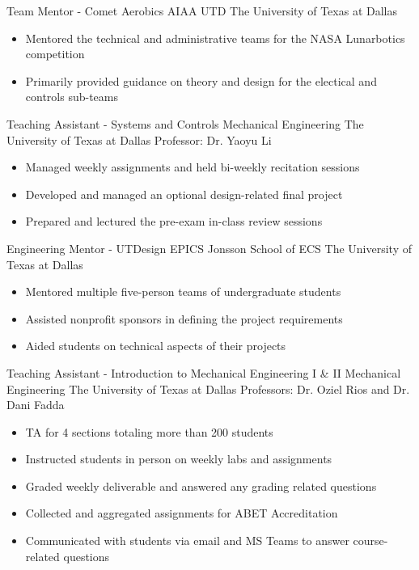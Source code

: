 \documentclass[11pt,letterpaper,roman]{moderncv} %
\begin{document}
{Team Mentor - Comet Aerobics}
{AIAA UTD}
{The University of Texas at Dallas}{}
{\begin{itemize}
    \item Mentored the technical and administrative teams for the NASA Lunarbotics competition
    \item Primarily provided guidance on theory and design for the electical and controls sub-teams
\end{itemize}}

{Teaching Assistant - Systems and Controls}
{Mechanical Engineering}
{The University of Texas at Dallas}
{Professor: Dr. Yaoyu Li}
{\begin{itemize}
    \item Managed weekly assignments and held bi-weekly recitation sessions
    \item Developed and managed an optional design-related final project
    \item Prepared and lectured the pre-exam in-class review sessions
\end{itemize}}

{Engineering Mentor - UTDesign EPICS}
{Jonsson School of ECS}%
{The University of Texas at Dallas}{}
{\begin{itemize}
    \item Mentored multiple five-person teams of undergraduate students 
    \item Assisted nonprofit sponsors in defining the project requirements
    \item Aided students on technical aspects of their projects
\end{itemize}}

{Teaching Assistant - Introduction to Mechanical Engineering I \& II}
{Mechanical Engineering}
{The University of Texas at Dallas}
{Professors: Dr. Oziel Rios and Dr. Dani Fadda}
{\begin{itemize}
    \item TA for 4 sections totaling more than 200 students
    \item Instructed students in person on weekly labs and assignments
    \item Graded weekly deliverable and answered any grading related questions
    \item Collected and aggregated assignments for ABET Accreditation
    \item Communicated with students via email and MS Teams to answer course-related questions
\end{itemize}}
\end{document}
